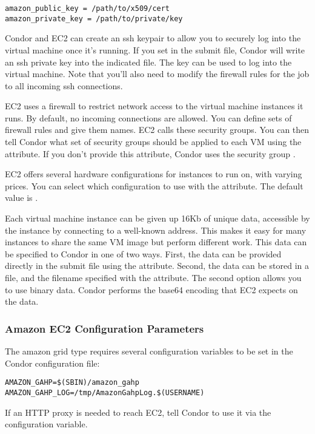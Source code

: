\begin{verbatim}
amazon_public_key = /path/to/x509/cert
amazon_private_key = /path/to/private/key
\end{verbatim}

Condor and EC2 can create an ssh keypair to allow you to securely log
into the virtual machine once it's running. If you set
 in the submit file, Condor will write
an ssh private key into the indicated file. The key can be used to log
into the virtual machine. Note that you'll also need to modify the firewall
rules for the job to all incoming ssh connections.

EC2 uses a firewall to restrict network access to the virtual machine
instances it runs. By default, no incoming connections are allowed.
You can define sets of firewall rules and give them names. EC2 calls
these security groups. You can then tell Condor what set of security
groups should be applied to each VM using the
 attribute. If you don't provide
this attribute, Condor uses the security group .

EC2 offers several hardware configurations for instances to run on, with
varying prices. You can select which configuration to use with the
 attribute. The default value is
.

Each virtual machine instance can be given up 16Kb of unique data, 
accessible by the instance by connecting to a well-known address. This
makes it easy for many instances to share the same VM image but perform
different work. This data can be specified to Condor in one of two ways.
First, the data can be provided directly in the submit file using the
 attribute. Second, the data can be
stored in a file, and the filename specified with the
 attribute. The second option allows
you to use binary data. Condor performs the base64 encoding that EC2
expects on the data.

\subsubsection{\label{sec:Amazon-config}Amazon EC2 Configuration Parameters}

The amazon grid type requires several configuration variables 
to be set in the Condor configuration file:

\footnotesize
\begin{verbatim}
AMAZON_GAHP=$(SBIN)/amazon_gahp
AMAZON_GAHP_LOG=/tmp/AmazonGahpLog.$(USERNAME)
\end{verbatim}
\normalsize

If an HTTP proxy is needed to reach EC2, tell Condor to use it
via the  configuration variable.

